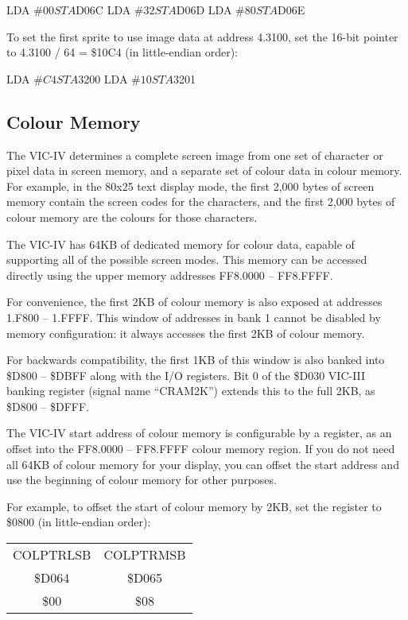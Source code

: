 \begin{asmcode}
LDA #$00
STA $D06C
LDA #$32
STA $D06D
LDA #$80
STA $D06E
\end{asmcode}

To set the first sprite to use image data at address 4.3100, set the 16-bit pointer to 4.3100 / 64 = \$10C4 (in little-endian order):

\begin{asmcode}
LDA #$C4
STA $3200
LDA #$10
STA $3201
\end{asmcode}

\subsection{Colour Memory}

The VIC-IV determines a complete screen image from one set of character or pixel data in screen memory, and a separate set of colour data in colour memory. For example, in the 80x25 text display mode, the first 2,000 bytes of screen memory contain the screen codes for the characters, and the first 2,000 bytes of colour memory are the colours for those characters.

The VIC-IV has 64KB of dedicated memory for colour data, capable of supporting all of the possible screen modes. This memory can be accessed directly using the upper memory addresses FF8.0000 -- FF8.FFFF.

For convenience, the first 2KB of colour memory is also exposed at addresses 1.F800 -- 1.FFFF. This window of addresses in bank 1 cannot be disabled by memory configuration: it always accesses the first 2KB of colour memory.

For backwards compatibility, the first 1KB of this window is also banked into \$D800 -- \$DBFF along with the I/O registers. Bit 0 of the \$D030 VIC-III banking register (signal name ``CRAM2K'') extends this to the full 2KB, as \$D800 -- \$DFFF.

The VIC-IV start address of colour memory is configurable by a register, as an offset into the FF8.0000 -- FF8.FFFF colour memory region. If you do not need all 64KB of colour memory for your display, you can offset the start address and use the beginning of colour memory for other purposes.

For example, to offset the start of colour memory by 2KB, set the register to \$0800 (in little-endian order):

\begin{center}
\begin{tabular}{|c|c|}
\hline
COLPTRLSB & COLPTRMSB \\
\$D064 & \$D065 \\
\hline
\$00 & \$08 \\
\hline
\end{tabular}
\end{center}

